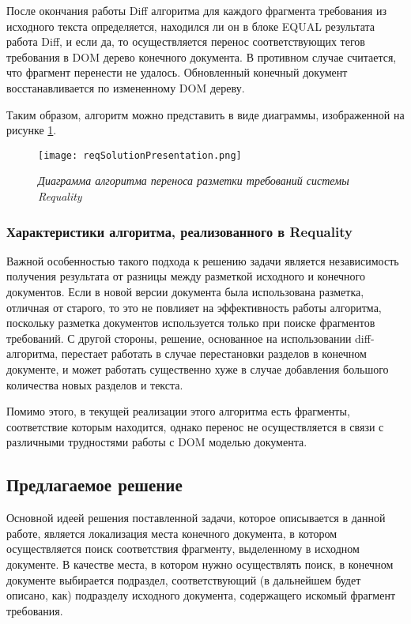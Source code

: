 После окончания работы Diff алгоритма для каждого фрагмента требования из исходного текста определяется, находился ли он в блоке EQUAL результата работа Diff, и если да, то осуществляется перенос соответствующих тегов требования в DOM дерево конечного документа. В противном случае считается, что фрагмент перенести не удалось. Обновленный конечный документ восстанавливается по измененному DOM дереву.

Таким образом, алгоритм можно представить в виде диаграммы, изображенной на рисунке \ref{pr:image6}.

\begin{figure}[h]
\begin{center}
\texttt{[image: reqSolutionPresentation.png]}
\caption{\emph{Диаграмма алгоритма переноса разметки требований системы Requality}}
\label{pr:image6}
\end{center}
\end{figure}

\subsubsection{Характеристики алгоритма, реализованного в Requality}

Важной особенностью такого подхода к решению задачи является независимость получения результата от разницы между разметкой исходного и конечного документов. Если в новой версии документа была использована разметка, отличная от старого, то это не повлияет на эффективность работы алгоритма, поскольку разметка документов используется только при поиске фрагментов требований. С другой стороны, решение, основанное на использовании diff-алгоритма, перестает работать в случае перестановки разделов в конечном документе, и может работать существенно хуже в случае добавления большого количества новых разделов и текста.

Помимо этого, в текущей реализации этого алгоритма есть фрагменты, соответствие которым находится, однако перенос не осуществляется в связи с различными трудностями работы с DOM моделью документа.

\subsection{Предлагаемое решение}

Основной идеей решения поставленной задачи, которое описывается в данной работе, является локализация места конечного документа, в котором осуществляется поиск соответствия фрагменту, выделенному в исходном документе. В качестве места, в котором нужно осуществлять поиск, в конечном документе выбирается подраздел, соответствующий (в дальнейшем будет описано, как) подразделу исходного документа, содержащего искомый фрагмент требования.

